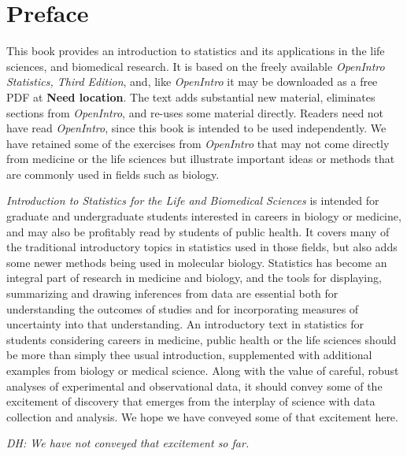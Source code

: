 
\chapter*{Preface}



This book provides an introduction to statistics and its applications in the life sciences, and biomedical research.  It is based on the freely available \textsl{OpenIntro Statistics, Third Edition}, and, like \textsl{OpenIntro} it may be downloaded as a free PDF at \textbf{Need location}.  The text adds substantial new material, eliminates sections from \textsl{OpenIntro}, and re-uses some material directly.  Readers need not have read \textsl{OpenIntro}, since this book is intended to be used independently.  We have retained some of the exercises from \textsl{OpenIntro} that may not come directly from medicine or the life sciences but illustrate important ideas or methods that are commonly used in fields such as biology.

\textsl{Introduction to Statistics for the Life and Biomedical Sciences} is intended for graduate and undergraduate students interested in careers in biology or medicine, and may also be profitably read by students of public health.  It covers many of the traditional introductory topics in statistics used in those fields, but also adds some newer methods being used in molecular biology.  Statistics has become an integral part of research in medicine and biology, and the tools for displaying, summarizing and drawing inferences from data are essential both for understanding the outcomes of studies and for incorporating measures of uncertainty into that understanding.  An introductory text in statistics for students considering careers in medicine, public health or the life sciences should be more than simply thee usual introduction, supplemented with additional examples from biology or medical science. Along with the value of careful, robust analyses of experimental and observational data, it should convey some of the excitement of discovery that emerges from the interplay of science with data collection and analysis.  We hope we have conveyed some of that excitement here. 

\textit{DH: We have not conveyed that excitement so far.}


